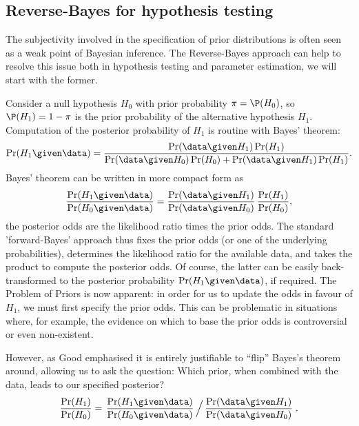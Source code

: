 \subsection{Reverse-Bayes for hypothesis testing}
The subjectivity involved in the specification of prior distributions is often
seen as a weak point of Bayesian inference. The Reverse-Bayes approach can help
to resolve this issue both in hypothesis testing and parameter estimation, we
will start with the former.

Consider a null hypothesis $H_0$ with prior probability $\pi=\P(H_0)$, so
$\P(H_1) =1-\pi$ is the prior probability of the alternative hypothesis $H_1$.
Computation of the posterior probability of $H_1$ is routine with Bayes'
theorem:
\begin{equation*}
  \Pr(H_{1} \given \data) = \frac{\Pr(\data \given H_{1}) \Pr(H_{1})}{\Pr(\data \given H_{0}) \Pr(H_{0}) +
    \Pr(\data \given H_{1}) \Pr(H_{1})}.
\end{equation*}
Bayes' theorem can be written in more compact form as
\begin{equation}\label{eq4:eq0}
  \frac{\Pr(H_{1} \given \data)}{\Pr(H_{0} \given \data)} =
  \frac{\Pr(\data \given H_{1})}{\Pr(\data \given H_{0})} \,  \frac{\Pr(H_{1})}{\Pr(H_{0})},
\end{equation}
\ie the posterior odds are the likelihood ratio times the prior odds. The
standard 'forward-Bayes' approach thus fixes the prior odds (or one of the
underlying probabilities), determines the likelihood ratio for the available
data, and takes the product to compute the posterior odds. Of course, the latter
can be easily back-transformed to the posterior probability
$\Pr(H_{1} \given \data)$, if required. The Problem of Priors is now apparent:
in order for us to update the odds in favour of $H_1$, we must first specify the
prior odds. This can be problematic in situations where, for example, the
evidence on which to base the prior odds is controversial or even non-existent.

However, as Good emphasised it is entirely justifiable to ``flip'' Bayes's
theorem around, allowing us to ask the question: Which prior, when combined with
the data, leads to our specified posterior?
\begin{equation}\label{eq4:eq1}
  \frac{\Pr(H_{1})}{\Pr(H_{0})} = \left. \frac{\Pr(H_{1} \given \data)}{\Pr(H_{0} \given \data)} \, \Big/
\,   \frac{\Pr(\data \given H_{1})}{\Pr(\data \given H_{0})} \right. .
\end{equation}

